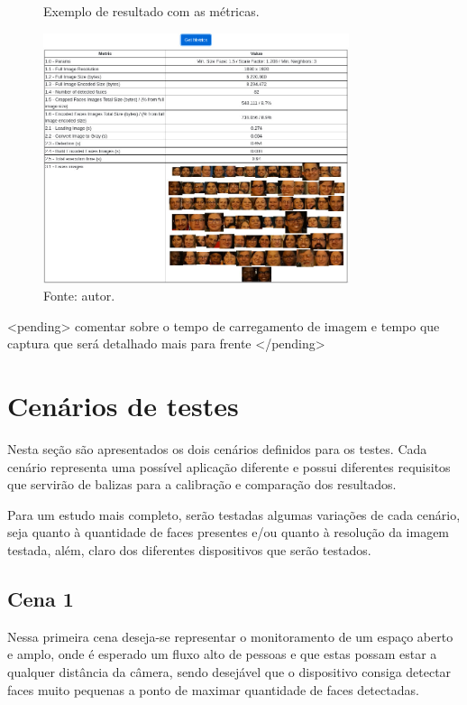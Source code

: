 \begin{figure}[h]
    \centering
    \caption[Exemplo de resultado com as métricas.]{Exemplo de resultado com as métricas.}
    \includegraphics[width=0.8\textwidth]{Cap3_Desenvolvimento/Figures/exemplo_metricas.jpg}
    \caption*{Fonte: autor.}
    \label{fig:resultadoMetricas}
\end{figure}

<pending> comentar sobre o tempo de carregamento de imagem e tempo que captura que será detalhado mais para frente </pending>


\section{Cenários de testes}

Nesta seção são apresentados os dois cenários definidos para os testes. Cada cenário representa uma possível aplicação diferente e possui diferentes requisitos que servirão de balizas para a calibração e comparação dos resultados.

Para um estudo mais completo, serão testadas algumas variações de cada cenário, seja quanto à quantidade de faces presentes e/ou quanto à resolução da imagem testada, além, claro dos diferentes dispositivos que serão testados.

\subsection{Cena 1}

Nessa primeira cena deseja-se representar o monitoramento de um espaço aberto e amplo, onde é esperado um fluxo alto de pessoas e que estas possam estar a qualquer distância da câmera, sendo desejável que o dispositivo consiga detectar faces muito pequenas a ponto de maximar quantidade de faces detectadas.

